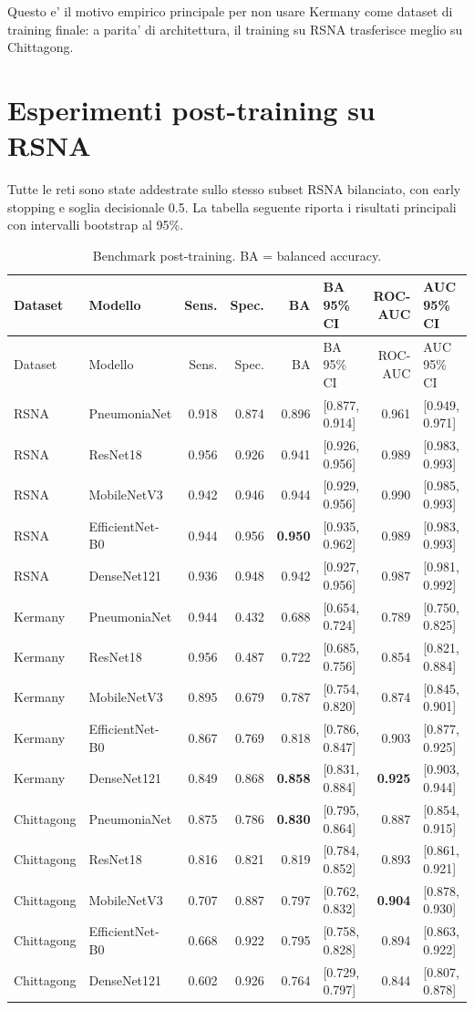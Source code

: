 \documentclass[11pt,a4paper]{article}
\newcommand{\auc}{ROC-AUC}
\begin{document}
Questo e' il motivo empirico principale per non usare Kermany come dataset di
training finale: a parita' di architettura, il training su RSNA trasferisce
meglio su Chittagong.

\section{Esperimenti post-training su RSNA}

Tutte le reti sono state addestrate sullo stesso subset RSNA bilanciato, con
early stopping e soglia decisionale 0.5. La tabella seguente riporta i risultati
principali con intervalli bootstrap al 95\%.

\small
\begin{longtable}{llrrrlrl}
\caption{Benchmark post-training. BA = balanced accuracy.}\label{tab:benchmark-post-training}\\
\toprule
Dataset & Modello & Sens. & Spec. & BA & BA 95\% CI & \auc & AUC 95\% CI \\
\midrule
\endfirsthead
\toprule
Dataset & Modello & Sens. & Spec. & BA & BA 95\% CI & \auc & AUC 95\% CI \\
\midrule
\endhead
RSNA & PneumoniaNet & 0.918 & 0.874 & 0.896 & [0.877, 0.914] & 0.961 & [0.949, 0.971] \\
RSNA & ResNet18 & 0.956 & 0.926 & 0.941 & [0.926, 0.956] & 0.989 & [0.983, 0.993] \\
RSNA & MobileNetV3 & 0.942 & 0.946 & 0.944 & [0.929, 0.956] & 0.990 & [0.985, 0.993] \\
RSNA & EfficientNet-B0 & 0.944 & 0.956 & \textbf{0.950} & [0.935, 0.962] & 0.989 & [0.983, 0.993] \\
RSNA & DenseNet121 & 0.936 & 0.948 & 0.942 & [0.927, 0.956] & 0.987 & [0.981, 0.992] \\
\midrule
Kermany & PneumoniaNet & 0.944 & 0.432 & 0.688 & [0.654, 0.724] & 0.789 & [0.750, 0.825] \\
Kermany & ResNet18 & 0.956 & 0.487 & 0.722 & [0.685, 0.756] & 0.854 & [0.821, 0.884] \\
Kermany & MobileNetV3 & 0.895 & 0.679 & 0.787 & [0.754, 0.820] & 0.874 & [0.845, 0.901] \\
Kermany & EfficientNet-B0 & 0.867 & 0.769 & 0.818 & [0.786, 0.847] & 0.903 & [0.877, 0.925] \\
Kermany & DenseNet121 & 0.849 & 0.868 & \textbf{0.858} & [0.831, 0.884] & \textbf{0.925} & [0.903, 0.944] \\
\midrule
Chittagong & PneumoniaNet & 0.875 & 0.786 & \textbf{0.830} & [0.795, 0.864] & 0.887 & [0.854, 0.915] \\
Chittagong & ResNet18 & 0.816 & 0.821 & 0.819 & [0.784, 0.852] & 0.893 & [0.861, 0.921] \\
Chittagong & MobileNetV3 & 0.707 & 0.887 & 0.797 & [0.762, 0.832] & \textbf{0.904} & [0.878, 0.930] \\
Chittagong & EfficientNet-B0 & 0.668 & 0.922 & 0.795 & [0.758, 0.828] & 0.894 & [0.863, 0.922] \\
Chittagong & DenseNet121 & 0.602 & 0.926 & 0.764 & [0.729, 0.797] & 0.844 & [0.807, 0.878] \\
\bottomrule
\end{longtable}
\normalsize
\end{document}
